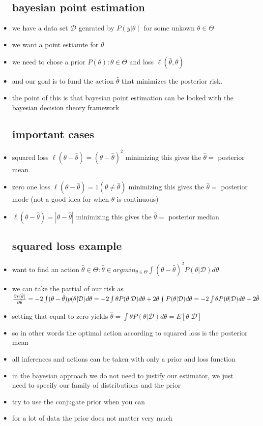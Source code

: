 \documentclass{article}
\begin{document}
\begin{itemize}
\subsection*{bayesian point estimation}
\item we have a data set $\mathcal{D}$ genrated by $P(y|\theta)$ for some unkown $\theta\in \Theta$
\item we want a point estiamte for $\theta$
\item we need to chose a prior $P(\theta):\theta\in \Theta$ and loss $\ell(\hat{\theta},\theta)$
\item and our goal is to fund the action $\hat{\theta}$ that minimizes the posterior risk. 
\item the point of this is that bayesian point estimation can be looked with the bayesian decision theory framework
\subsection*{important cases }
\item  squared loss $\ell(\theta-\hat{\theta})=(\theta-\hat{\theta} )^2$ minimizing this gives the $\hat{\theta}=$ posterior mean 
\item zero one loss $\ell(\theta-\hat{\theta})=1(\theta \neq \hat{\theta} )$ minimizing this gives the $\hat{\theta}=$ posterior mode (not a good idea for when $\theta$ is continuous)
\item $\ell(\theta-\hat{\theta})=|\theta-\hat{\theta} |$ minimizing this gives the $\hat{\theta}=$ posterior median 
\subsection*{squared loss example}
\item want to find an action $\hat{\theta}\in \Theta: \hat{\theta}\in argmin_{\theta\in \Theta}\int(\theta-\hat{\theta})^2P(\theta|\mathcal{D})d\theta$
\item we can take the partial of our risk as $\frac{\partial r(\hat{\theta})}{\partial \hat{\theta}}=-2\int(\theta-\hat{\theta})p(\theta|\mathcal{D})d\theta\\
=-2\int\theta P(\theta|\mathcal{D})d\theta+2\theta\int P(\theta|\mathcal{D})d\theta=-2\int \theta P(\theta|\mathcal{D})d\theta+2\hat{\theta}$
\item setting that equal to zero yields $\hat{\theta}=\int\theta P(\theta|\mathcal{D})d\theta=E[\theta|\mathcal{D}]$ 
\item so in other words the optimal action according to squared loss is the posterior mean 
\item all inferences and actions can be taken with only a prior and loss function 
\item in the bayesian approach we do not need to justify our estimator, we just need to specify our family of distributions and the prior
\item try to use the conjugate prior when you can 
\item for a lot of data the prior does not matter very much 

\end{itemize}
\end{document}
